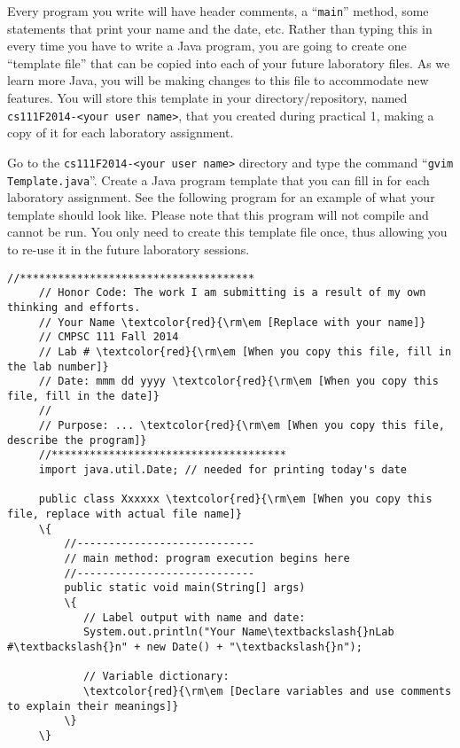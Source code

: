 Every program you write will have header comments, a ``{\tt main}'' method, some statements that print your name and the
date, etc. Rather than typing this in every time you have to write a Java program, you are going to create one
``template file'' that can be copied into each of your future laboratory files. As we learn more Java, you will be
making changes to this file to accommodate new features. You will store this template in your directory/repository,
named {\tt cs111F2014-<your user name>}, that you created during practical 1, making a copy of it for each laboratory
assignment.

\begin{sloppypar} Go to the {\tt cs111F2014-<your user name>} directory and type the command ``{\tt gvim
  Template.java}''.  Create a Java program template that you can fill in for each laboratory assignment.  See the
  following program for an example of what your template should look like.  Please note that this program will not
  compile and cannot be run.  You only need to create this template file once, thus allowing you to re-use it in the
future laboratory sessions.  \end{sloppypar}

\newpage
\begin{Verbatim}[commandchars=\\\{\}]
     //*************************************
     // Honor Code: The work I am submitting is a result of my own thinking and efforts.
     // Your Name \textcolor{red}{\rm\em [Replace with your name]}
     // CMPSC 111 Fall 2014
     // Lab # \textcolor{red}{\rm\em [When you copy this file, fill in the lab number]}
     // Date: mmm dd yyyy \textcolor{red}{\rm\em [When you copy this file, fill in the date]}
     //
     // Purpose: ... \textcolor{red}{\rm\em [When you copy this file, describe the program]}
     //*************************************     
     import java.util.Date; // needed for printing today's date
     
     public class Xxxxxx \textcolor{red}{\rm\em [When you copy this file, replace with actual file name]}
     \{
         //----------------------------
         // main method: program execution begins here
         //----------------------------
         public static void main(String[] args)
         \{
            // Label output with name and date:
            System.out.println("Your Name\textbackslash{}nLab #\textbackslash{}n" + new Date() + "\textbackslash{}n");
     
            // Variable dictionary:
            \textcolor{red}{\rm\em [Declare variables and use comments to explain their meanings]}    
         \}
     \}
\end{Verbatim}

